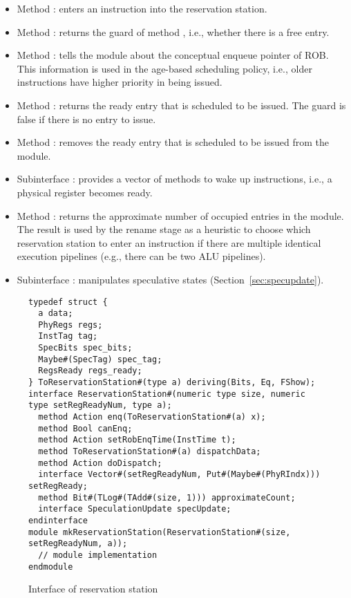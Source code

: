 \begin{itemize}
    \item Method : enters an instruction into the reservation station.
    \item Method : returns the guard of method , i.e., whether there is a free entry.
    \item Method : tells the module about the conceptual enqueue pointer of ROB.
    This information is used in the age-based scheduling policy, i.e., older instructions have higher priority in being issued.
    \item Method : returns the ready entry that is scheduled to be issued.
    The guard is false if there is no entry to issue.
    \item Method : removes the ready entry that is scheduled to be issued from the module.
    \item Subinterface : provides a vector of methods to wake up instructions, i.e., a physical register becomes ready.
    \item Method : returns the approximate number of occupied entries in the module.
    The result is used by the rename stage as a heuristic to choose which reservation station to enter an instruction if there are multiple identical execution pipelines (e.g., there can be two ALU pipelines).
    \item Subinterface : manipulates speculative states (Section~\ref{sec:specupdate}).
\end{itemize}

\begin{figure}[t]
\begin{lstlisting}[caption={}]
typedef struct {
  a data;
  PhyRegs regs;
  InstTag tag;
  SpecBits spec_bits;
  Maybe#(SpecTag) spec_tag;
  RegsReady regs_ready;
} ToReservationStation#(type a) deriving(Bits, Eq, FShow);
interface ReservationStation#(numeric type size, numeric type setRegReadyNum, type a);
  method Action enq(ToReservationStation#(a) x);
  method Bool canEnq;
  method Action setRobEnqTime(InstTime t);
  method ToReservationStation#(a) dispatchData;
  method Action doDispatch;
  interface Vector#(setRegReadyNum, Put#(Maybe#(PhyRIndx))) setRegReady;
  method Bit#(TLog#(TAdd#(size, 1))) approximateCount;
  interface SpeculationUpdate specUpdate;
endinterface
module mkReservationStation(ReservationStation#(size, setRegReadyNum, a));
  // module implementation
endmodule
\end{lstlisting}
\caption{Interface of reservation station}\label{fig:rs-ifc}
\end{figure}

